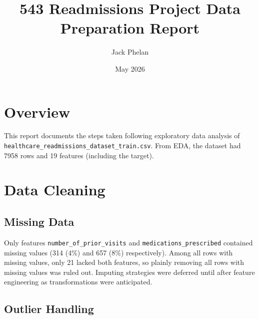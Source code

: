 \documentclass{article}
\title{543 Readmissions Project Data Preparation Report}
\author{Jack Phelan}
\date{May 2026}
\begin{document}
\maketitle
\tableofcontents
\newpage

\section{Overview}

\par This report documents the steps taken following exploratory data analysis of
\texttt{healthcare\_readmissions\_dataset\_train.csv}. From EDA, the dataset had 7958 rows
and 19 features (including the target).

\section{Data Cleaning}

\subsection{Missing Data}
\par Only features \texttt{number\_of\_prior\_visits} and \texttt{medications\_prescribed}
contained missing values (314 (4\%) and 657 (8\%) respectively). Among all rows with missing values,
only 21 lacked both features, so plainly removing all rows with missing values was ruled out.
Imputing strategies were deferred until after feature engineering as transformations were anticipated.

\subsection{Outlier Handling}
\end{document}
